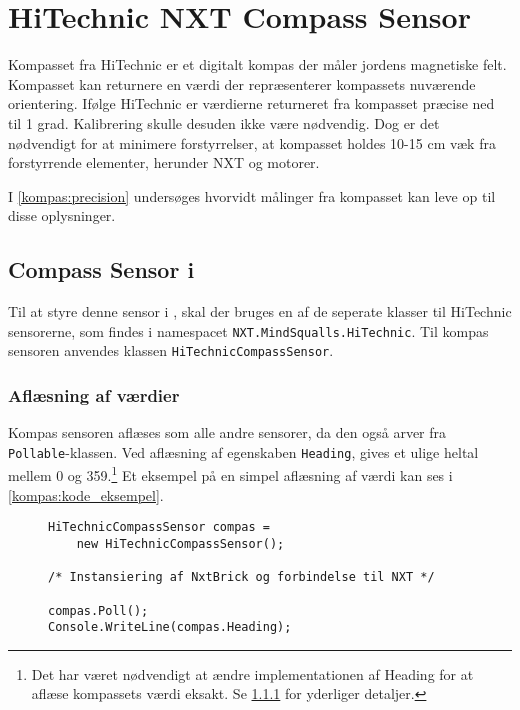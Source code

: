 \section{HiTechnic NXT Compass Sensor}
Kompasset fra HiTechnic er et digitalt kompas der måler jordens magnetiske felt.
Kompasset kan returnere en værdi der repræsenterer kompassets nuværende orientering.
Ifølge HiTechnic er værdierne returneret fra kompasset præcise ned til 1 grad.
Kalibrering skulle desuden ikke være nødvendig.
Dog er det nødvendigt for at minimere forstyrrelser, at kompasset holdes 10-15 cm væk fra forstyrrende elementer, herunder \lego NXT og motorer.\cite{hitechnic_compass}

I \cref{kompas:precision} undersøges hvorvidt målinger fra kompasset kan leve op til disse oplysninger.

\subsection{Compass Sensor i \mindsqualls}
Til at styre denne sensor i \mindsqualls, skal der bruges en af de seperate klasser til HiTechnic sensorerne, som findes i namespacet \lstinline[style=csharp]!NXT.MindSqualls.HiTechnic!.
Til kompas sensoren anvendes klassen \lstinline[style=csharp]!HiTechnicCompassSensor!.

\subsubsection{Aflæsning af værdier}
Kompas sensoren aflæses som alle andre sensorer, da den også arver fra \lstinline[style=csharp]!Pollable!-klassen.
Ved aflæsning af egenskaben \lstinline[style=csharp]!Heading!, gives et ulige heltal mellem 0 og 359.\footnote{Det har været nødvendigt at ændre implementationen af Heading for at aflæse kompassets værdi eksakt.
Se \cref{} for yderliger detaljer.}
Et eksempel på en simpel aflæsning af værdi kan ses i \cref{kompas:kode_eksempel}.

\begin{figure}[h]
\begin{lstlisting}[style=csharpsmall,caption={Et eksempel på brug af Compass Sensor},label=kompas:kode_eksempel,frame=single]
HiTechnicCompassSensor compas =
	new HiTechnicCompassSensor();
	
/* Instansiering af NxtBrick og forbindelse til NXT */

compas.Poll();
Console.WriteLine(compas.Heading);
\end{lstlisting}
\end{figure}

